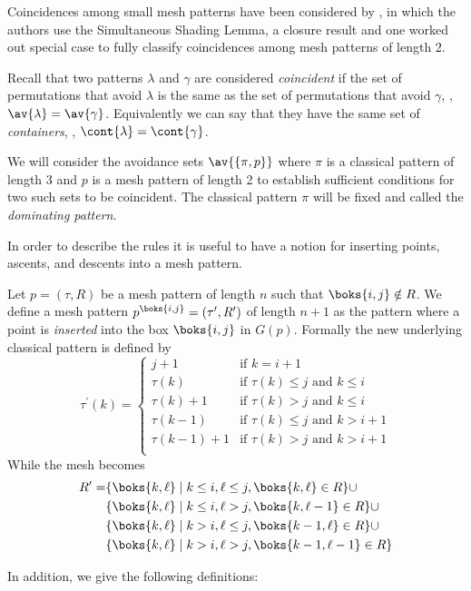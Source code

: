 Coincidences among small mesh patterns have been considered by
\textcite{DBLP:journals/corr/ClaessonTU14}, in which the authors use the Simultaneous Shading Lemma,
a closure result and one worked out special case to fully classify coincidences among mesh patterns
of length 2.

Recall that two patterns \(\lambda\) and \(\gamma\) are considered \emph{coincident} if the set of permutations
that avoid \(\lambda\) is the same as the set of permutations that avoid \(\gamma\),
\ie, \(\av{\lambda} = \av{\gamma}\). Equivalently we can say that they have the same set of
\emph{containers}, \ie, \(\cont{\lambda} = \cont{\gamma}\).

We will consider the avoidance sets \(\av{\{\pi,p\}}\) where \(\pi\) is a classical pattern of length 3
and \(p\) is a mesh pattern of length 2 to establish sufficient conditions for two such
sets to be coincident. The classical pattern \(\pi\) will be fixed and called
the \emph{dominating pattern}.

In order to describe the rules it is useful to have a notion for inserting points, ascents, and
descents into a mesh pattern.
\begin{definition}
\label{def:ap}
Let \(p=(\tau,R)\) be a mesh pattern of length \(n\) such that \(\boks{i,j}\notin R\). We define
a mesh pattern \(p^\boks{i,j} = (\tau^\prime,R^\prime)\) of length \(n+1\) as the pattern where a
point is \emph{inserted} into the box \(\boks{i,j}\) in \(G(p)\). Formally the new underlying
classical pattern is defined by
\begin{equation*}
\tau^\prime(k) = \begin{cases}
    j+1 & \text{if } k = i+1\\
    \tau(k) & \text{if } \tau(k)\le j \text{ and }k\le i\\
    \tau(k)+1 & \text{if } \tau(k)> j \text{ and }k\le i\\
    \tau(k-1) & \text{if } \tau(k)\le j \text{ and }k> i+1\\
    \tau(k-1)+1 & \text{if } \tau(k)> j \text{ and }k> i+1\\
\end{cases}
\end{equation*}
While the mesh becomes
\begin{equation*}
\begin{aligned}
R^\prime=&\{\boks{k,\ell}\mid k\le i, \ell\le j, \boks{k,\ell}\in R\} \cup\\
&\{\boks{k,\ell}\mid k\le i, \ell > j, \boks{k,\ell-1}\in R\}\cup\\
&\{\boks{k,\ell}\mid k > i, \ell \le j, \boks{k-1,\ell}\in R\}\cup\\
&\{\boks{k,\ell}\mid k > i, \ell > j, \boks{k-1,\ell-1}\in R\}\\
\end{aligned}
\end{equation*}
\end{definition}
In addition, we give the following definitions:

